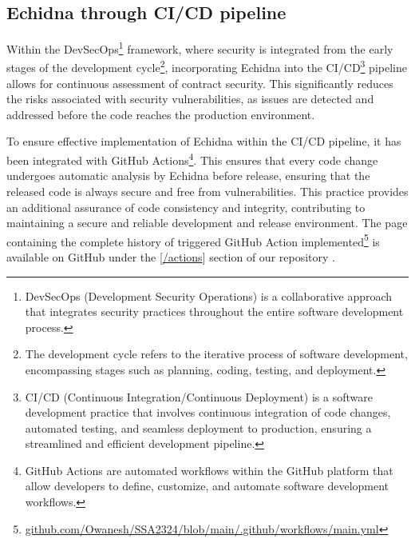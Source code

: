 \documentclass{article}
\begin{document}
\subsection{Echidna through CI/CD pipeline}
Within the DevSecOps\footnote{DevSecOps (Development Security Operations)  is a collaborative approach that integrates security practices throughout the entire software development process.} framework, where security is integrated from the early stages of the development cycle\footnote{The development cycle refers to the iterative process of software development, encompassing stages such as planning, coding, testing, and deployment.}, incorporating Echidna into the CI/CD\footnote{CI/CD (Continuous Integration/Continuous Deployment) is a software development practice that involves continuous integration of code changes, automated testing, and seamless deployment to production, ensuring a streamlined and efficient development pipeline.} pipeline allows for continuous assessment of contract security. This significantly reduces the risks associated with security vulnerabilities, as issues are detected and addressed before the code reaches the production environment.

To ensure effective implementation of Echidna within the CI/CD pipeline, it has been integrated with GitHub Actions\footnote{GitHub Actions are automated workflows within the GitHub platform that allow developers to define, customize, and automate software development workflows.}. This ensures that every code change undergoes automatic analysis by Echidna before release, ensuring that the released code is always secure and free from vulnerabilities. This practice provides an additional assurance of code consistency and integrity, contributing to maintaining a secure and reliable development and release environment.
The page containing the complete history of triggered GitHub Action implemented\footnote{\href{https://github.com/Owanesh/SSA2324/blob/main/.github/workflows/main.yml}{github.com/Owanesh/SSA2324/blob/main/.github/workflows/main.yml}} is available on GitHub under the [\href{https://github.com/Owanesh/SSA2324/actions}{/actions}] section of our repository .
\end{document}
